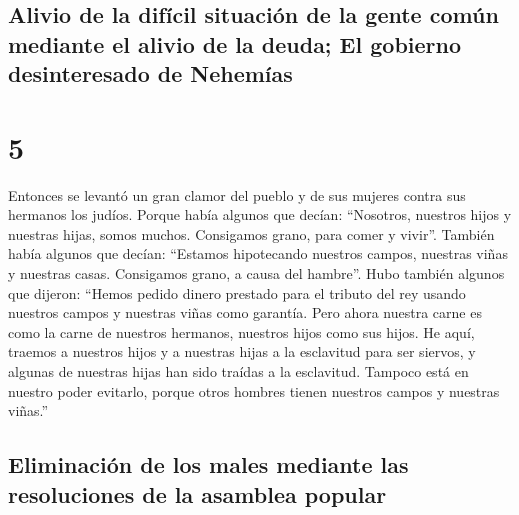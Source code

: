 \hypertarget{alivio-de-la-difuxedcil-situaciuxf3n-de-la-gente-comuxfan-mediante-el-alivio-de-la-deuda-el-gobierno-desinteresado-de-nehemuxedas}{%
\subsection{Alivio de la difícil situación de la gente común mediante el
alivio de la deuda; El gobierno desinteresado de
Nehemías}\label{alivio-de-la-difuxedcil-situaciuxf3n-de-la-gente-comuxfan-mediante-el-alivio-de-la-deuda-el-gobierno-desinteresado-de-nehemuxedas}}

\hypertarget{section-4}{%
\section{5}\label{section-4}}

 Entonces se levantó un gran clamor del pueblo y de sus
mujeres contra sus hermanos los judíos.  Porque había
algunos que decían: ``Nosotros, nuestros hijos y nuestras hijas, somos
muchos. Consigamos grano, para comer y vivir''.  También
había algunos que decían: ``Estamos hipotecando nuestros campos,
nuestras viñas y nuestras casas. Consigamos grano, a causa del hambre''.
 Hubo también algunos que dijeron: ``Hemos pedido dinero
prestado para el tributo del rey usando nuestros campos y nuestras viñas
como garantía.  Pero ahora nuestra carne es como la carne
de nuestros hermanos, nuestros hijos como sus hijos. He aquí, traemos a
nuestros hijos y a nuestras hijas a la esclavitud para ser siervos, y
algunas de nuestras hijas han sido traídas a la esclavitud. Tampoco está
en nuestro poder evitarlo, porque otros hombres tienen nuestros campos y
nuestras viñas.''

\hypertarget{eliminaciuxf3n-de-los-males-mediante-las-resoluciones-de-la-asamblea-popular}{%
\subsection{Eliminación de los males mediante las resoluciones de la
asamblea
popular}\label{eliminaciuxf3n-de-los-males-mediante-las-resoluciones-de-la-asamblea-popular}}

